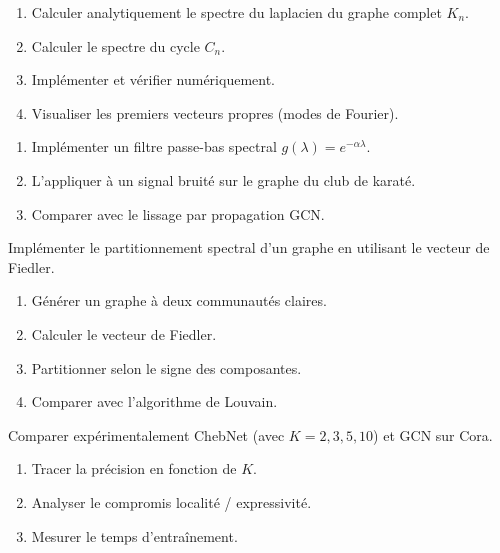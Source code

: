 \begin{exercice}
\begin{enumerate}
    \item Calculer analytiquement le spectre du laplacien du graphe complet $K_n$.
    \item Calculer le spectre du cycle $C_n$.
    \item Impl\'ementer et v\'erifier num\'eriquement.
    \item Visualiser les premiers vecteurs propres (modes de Fourier).
\end{enumerate}
\end{exercice}

\begin{exercice}
\begin{enumerate}
    \item Impl\'ementer un filtre passe-bas spectral $g(\lambda) = e^{-\alpha\lambda}$.
    \item L'appliquer \`a un signal bruit\'e sur le graphe du club de karat\'e.
    \item Comparer avec le lissage par propagation GCN.
\end{enumerate}
\end{exercice}

\begin{exercice}
Impl\'ementer le partitionnement spectral d'un graphe en utilisant le vecteur
de Fiedler.
\begin{enumerate}
    \item G\'en\'erer un graphe \`a deux communaut\'es claires.
    \item Calculer le vecteur de Fiedler.
    \item Partitionner selon le signe des composantes.
    \item Comparer avec l'algorithme de Louvain.
\end{enumerate}
\end{exercice}

\begin{exercice}
Comparer exp\'erimentalement ChebNet (avec $K = 2, 3, 5, 10$) et GCN sur Cora.
\begin{enumerate}
    \item Tracer la pr\'ecision en fonction de $K$.
    \item Analyser le compromis localit\'e / expressivit\'e.
    \item Mesurer le temps d'entra\^inement.
\end{enumerate}
\end{exercice}
